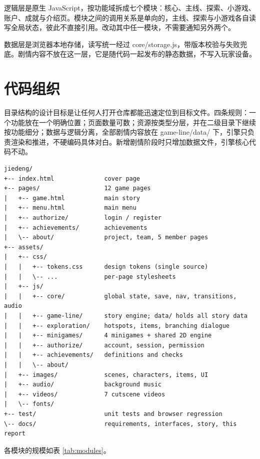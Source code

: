 逻辑层是原生 JavaScript，按功能域拆成七个模块：核心、主线、探索、小游戏、账户、成就与介绍页。模块之间的调用关系是单向的，主线、探索与小游戏各自读写全局状态，彼此不直接引用。改动其中任一模块，不需要通知另外两个。

数据层是浏览器本地存储，读写统一经过 core/storage.js，带版本校验与失败兜底。剧情内容不放在这一层，它是随代码一起发布的静态数据，不写入玩家设备。

\section{代码组织}

目录结构的设计目标是让任何人打开仓库都能迅速定位到目标文件。四条规则：一个功能放在一个明确位置；页面数量可数；资源按类型分层，并在二级目录下继续按功能细分；数据与逻辑分离，全部剧情内容放在 game-line/data/ 下，引擎只负责渲染和推进，不硬编码具体对白。新增剧情阶段时只增加数据文件，引擎核心代码不动。

\begin{lstlisting}[caption={项目目录结构}, label={lst:tree}]
jiedeng/
+-- index.html              cover page
+-- pages/                  12 game pages
|   +-- game.html           main story
|   +-- menu.html           main menu
|   +-- authorize/          login / register
|   +-- achievements/       achievements
|   \-- about/              project, team, 5 member pages
+-- assets/
|   +-- css/
|   |   +-- tokens.css      design tokens (single source)
|   |   \-- ...             per-page stylesheets
|   +-- js/
|   |   +-- core/           global state, save, nav, transitions, audio
|   |   +-- game-line/      story engine; data/ holds all story data
|   |   +-- exploration/    hotspots, items, branching dialogue
|   |   +-- minigames/      4 minigames + shared 2D engine
|   |   +-- authorize/      account, session, permission
|   |   +-- achievements/   definitions and checks
|   |   \-- about/
|   +-- images/             scenes, characters, items, UI
|   +-- audio/              background music
|   +-- videos/             7 cutscene videos
|   \-- fonts/
+-- test/                   unit tests and browser regression
\-- docs/                   requirements, interfaces, story, this report
\end{lstlisting}

各模块的规模如表 \ref{tab:modules}。

